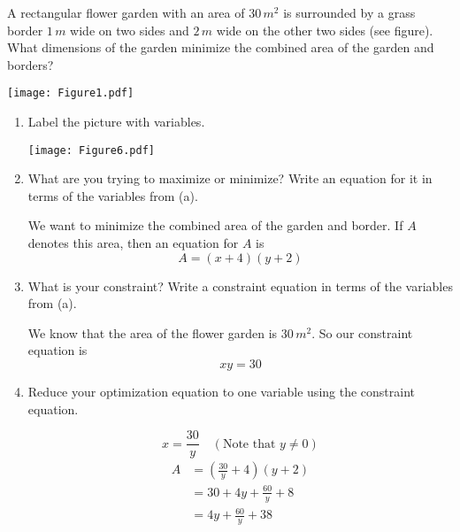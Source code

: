 \documentclass[handout,nooutcomes]{ximera}
\begin{document}
\begin{problem}
A rectangular flower garden with an area of $30 \, m^2$ is surrounded by a grass border $1 \, m$ wide on two sides and $2 \, m$ wide on the other two sides (see figure).  What dimensions of the garden minimize the combined area of the garden and borders?

	\begin{image}
	\texttt{[image: Figure1.pdf]}
	\end{image}

	\begin{enumerate}
	
	\item  Label the picture with variables.
		\begin{freeResponse}
		\begin{image}
		\texttt{[image: Figure6.pdf]}
		\end{image}
		\end{freeResponse}
		
		
		
	\item  What are you trying to maximize or minimize?  Write an equation for it in terms of the variables from (a).
		\begin{freeResponse}
		We want to minimize the combined area of the garden and border.  If $A$ denotes this area, then an equation for $A$ is
		$$ A = (x+4)(y+2) $$
		\end{freeResponse}
		
		
		
	\item  What is your constraint?  Write a constraint equation in terms of the variables from (a).
		\begin{freeResponse}
		We know that the area of the flower garden is $30 \, m^2$.  So our constraint equation is
		$$ xy = 30 $$
		\end{freeResponse}
		
		
		
	\item  Reduce your optimization equation to one variable using the constraint equation.
		\begin{freeResponse}
		$$ x = \frac{30}{y} \quad (\text{Note that } y \neq 0) $$
		\begin{align}
		A &= \left( \frac{30}{y} + 4 \right)(y+2) \\
		&= 30 + 4y + \frac{60}{y} + 8 \\
		&=4y + \frac{60}{y} + 38 \label{eqn3}
		\end{align}
		\end{freeResponse}
		

\end{enumerate}
\end{problem}
\end{document}
